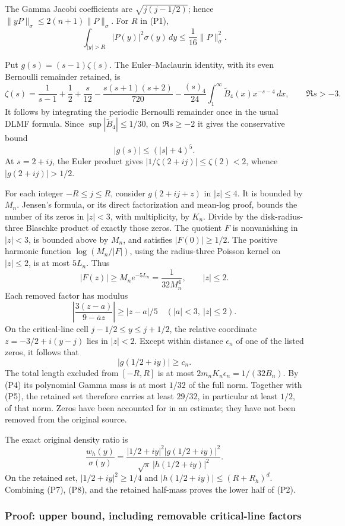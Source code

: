 \documentclass[11pt]{article}
\begin{document}
The Gamma Jacobi coefficients are \(\sqrt{j(j-1/2)}\); hence \(\|yP\|_\sigma\le2(n+1)\|P\|_\sigma\). For \(R\) in (P1), \[
 \int_{|y|>R}|P(y)|^2\sigma(y)\,dy
 \le\frac1{16}\|P\|_\sigma^2. \tag{P5}
\]

Put \(g(s)=(s-1)\zeta(s)\). The Euler--Maclaurin identity, with its even Bernoulli remainder retained, is \[
\zeta(s)=\frac1{s-1}+\frac12+\frac{s}{12}
-\frac{s(s+1)(s+2)}{720}
-\frac{(s)_4}{24}\int_1^\infty
 \widetilde B_4(x)x^{-s-4}\,dx,\qquad \Re s>-3.
\] It follows by integrating the periodic Bernoulli remainder once in the usual DLMF formula. Since \(\sup|\widetilde B_4|\le1/30\), on \(\Re s\ge-2\) it gives the conservative bound \[
 |g(s)|\le(|s|+4)^5. \tag{P6}
\] At \(s=2+ij\), the Euler product gives \(|1/\zeta(2+ij)|\le\zeta(2)<2\), whence \(|g(2+ij)|>1/2\).

For each integer \(-R\le j\le R\), consider \(g(2+ij+z)\) in \(|z|\le4\). It is bounded by \(M_n\). Jensen's formula, or its direct factorization and mean-log proof, bounds the number of its zeros in \(|z|<3\), with multiplicity, by \(K_n\). Divide by the disk-radius-three Blaschke product of exactly those zeros. The quotient \(F\) is nonvanishing in \(|z|<3\), is bounded above by \(M_n\), and satisfies \(|F(0)|\ge1/2\). The positive harmonic function \(\log(M_n/|F|)\), using the radius-three Poisson kernel on \(|z|\le2\), is at most \(5L_n\). Thus \[
 |F(z)|\ge M_ne^{-5L_n}=\frac1{32M_n^4},\qquad |z|\le2.
\] Each removed factor has modulus \[
 \left|\frac{3(z-a)}{9-\bar a z}\right|\ge|z-a|/5
 \quad(|a|<3,\ |z|\le2).
\] On the critical-line cell \(j-1/2\le y\le j+1/2\), the relative coordinate \(z=-3/2+i(y-j)\) lies in \(|z|<2\). Except within distance \(\epsilon_n\) of one of the listed zeros, it follows that \[
 |g(1/2+iy)|\ge c_n. \tag{P7}
\] The total length excluded from \([-R,R]\) is at most \(2m_nK_n\epsilon_n=1/(32B_n)\). By (P4) its polynomial Gamma mass is at most \(1/32\) of the full norm. Together with (P5), the retained set therefore carries at least \(29/32\), in particular at least \(1/2\), of that norm. Zeros have been accounted for in an estimate; they have not been removed from the original source.

The exact original density ratio is \[
 \frac{w_h(y)}{\sigma(y)}
 =\frac{|1/2+iy|^2|g(1/2+iy)|^2}
 {\sqrt\pi\,|h(1/2+iy)|^2}. \tag{P8}
\] On the retained set, \(|1/2+iy|^2\ge1/4\) and \(|h(1/2+iy)|\le(R+R_h)^d\). Combining (P7), (P8), and the retained half-mass proves the lower half of (P2).

\subsubsection{Proof: upper bound, including removable critical-line factors}\label{proof-upper-bound-including-removable-critical-line-factors}
\end{document}
